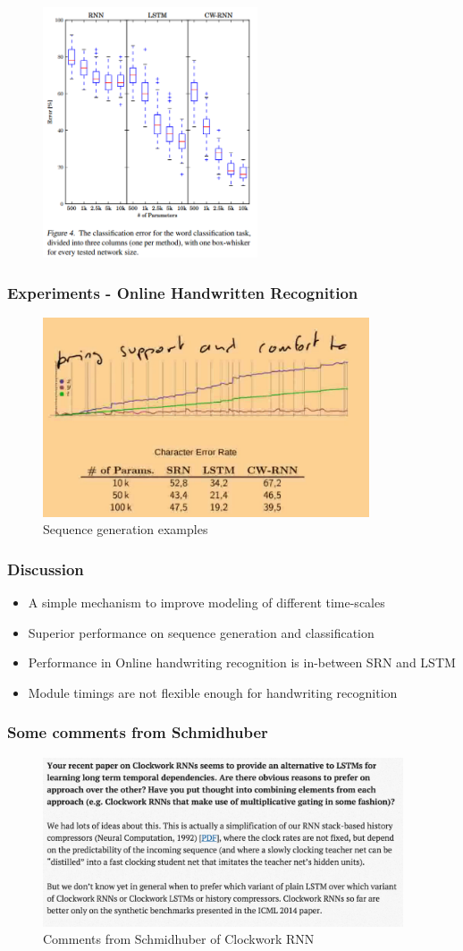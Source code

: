 \documentclass{beamer}
\begin{document}
{
	\begin{figure}[ht]  
		\begin{center}
			\includegraphics[width=2.5in]{Images/cwrnn_word_classification.png}   
		\end{center}   
	\end{figure}
}
\frame
{
   \frametitle{Experiments - Online Handwritten Recognition}
   \begin{figure}[ht]  
			\begin{center}
				\includegraphics[width=3.8in]{Images/cwrnn_handwritten.png}   
			\end{center}   
			\caption{\centering Sequence generation examples}
	\end{figure}
}
\frame
{
   \frametitle{Discussion}
   \begin{itemize}
   	\item A simple mechanism to improve modeling of different time-scales
   	\item Superior performance on sequence generation and classification
   	\item Performance in Online handwriting recognition is in-between SRN and LSTM
   	\item Module timings are not flexible enough for handwriting recognition
   \end{itemize}
}
\frame
{
   \frametitle{Some comments from Schmidhuber}
   \begin{figure}[ht]  
		\begin{center}
			\includegraphics[width=4.2in]{Images/comment_cwrnn.png}   
		\end{center}   
		\caption{Comments from Schmidhuber of Clockwork RNN}
	\end{figure}
}
\end{document}
